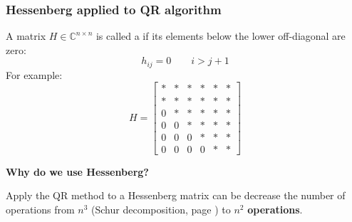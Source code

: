 \subsubsection{Hessenberg applied to QR algorithm}

A matrix $H \in \mathbb{C}^{n \times n}$ is called a  if its elements below the lower off-diagonal are zero:
\begin{equation*}
    h_{ij} = 0 \hspace{2em} i > j + 1
\end{equation*}
For example:
\begin{equation*}
    H = \begin{bmatrix}
        * & * & * & * & * & * \\
        * & * & * & * & * & * \\
        0 & * & * & * & * & * \\
        0 & 0 & * & * & * & * \\
        0 & 0 & 0 & * & * & * \\
        0 & 0 & 0 & 0 & * & *
    \end{bmatrix}
\end{equation*}

\highspace
\begin{flushleft}
    \textcolor{Green3}{ \textbf{Why do we use Hessenberg?}}
\end{flushleft}
Apply the QR method to a Hessenberg matrix can be decrease the number of operations from $n^{3}$ (Schur decomposition, page \pageref{subsubsection: Schur decomposition applied to QR algorithm}) to $n^{2}$ \textbf{operations}.

